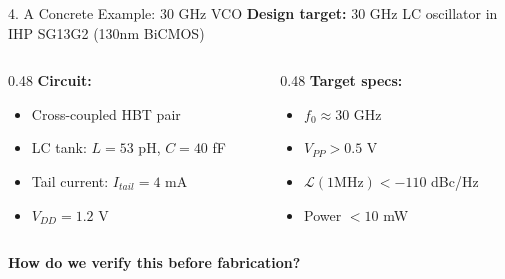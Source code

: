 \documentclass[aspectratio=169, 11pt]{beamer}
\begin{document}
\begin{frame}{4. A Concrete Example: 30 GHz VCO}
    \textbf{Design target:} 30 GHz LC oscillator in IHP SG13G2 (130nm BiCMOS)

    \vspace{0.5em}
    \begin{columns}[T]
        \begin{column}{0.48\textwidth}
            \textbf{Circuit:}
            \begin{itemize}
                \item Cross-coupled HBT pair
                \item LC tank: $L = 53$ pH, $C = 40$ fF
                \item Tail current: $I_{tail} = 4$ mA
                \item $V_{DD} = 1.2$ V
            \end{itemize}
        \end{column}
        \begin{column}{0.48\textwidth}
            \textbf{Target specs:}
            \begin{itemize}
                \item $f_0 \approx 30$ GHz
                \item $V_{PP} > 0.5$ V
                \item $\mathcal{L}(1\text{MHz}) < -110$ dBc/Hz
                \item Power $< 10$ mW
            \end{itemize}
        \end{column}
    \end{columns}

    \vspace{0.5em}
    \textbf{How do we verify this before fabrication?}
\end{frame}
\end{document}
